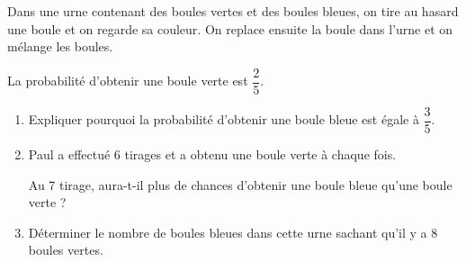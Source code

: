 
\medskip

Dans une urne contenant des boules vertes et des boules bleues, on tire au hasard une boule et on regarde sa
couleur. On replace ensuite la boule dans l'urne et on mélange les boules.

La probabilité d'obtenir une boule verte est $\dfrac{2}{5}$.
\medskip

\begin{enumerate}
\item Expliquer pourquoi la probabilité d'obtenir une boule bleue est égale à $\dfrac{3}{5}$.
\item  Paul a effectué 6 tirages et a obtenu une boule verte à chaque fois.

Au 7 tirage, aura-t-il plus de chances d'obtenir une boule bleue qu'une boule verte ?
\item  Déterminer le nombre de boules bleues dans cette urne sachant qu'il y a 8 boules vertes.
\end{enumerate} 

\vspace{0,5cm}

